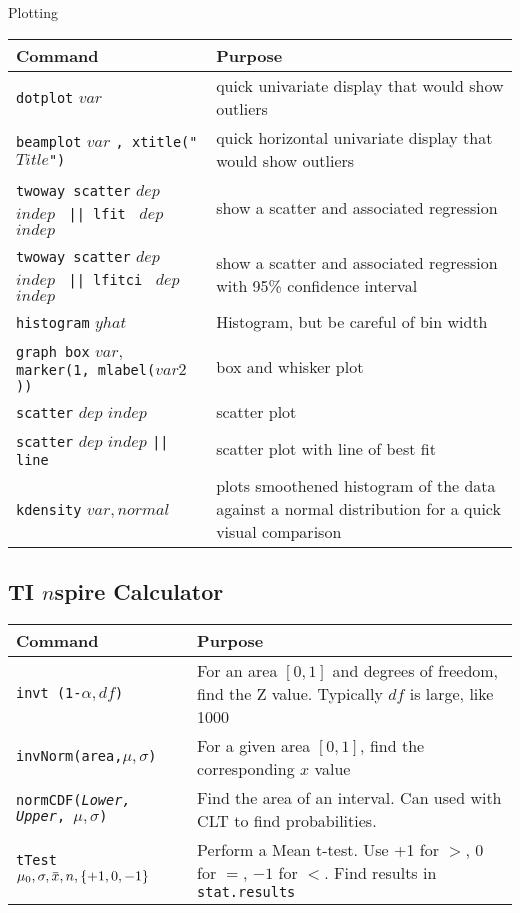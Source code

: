 \documentclass[11pt, oneside]{article}   	%
\newcommand{\overbar}[1]{\mkern 1.5mu\overline{\mkern-1.5mu#1\mkern-1.5mu}\mkern 1.5mu}
\begin{document}
\begin{center}
\large{Plotting}
\end{center}

\begin{tabular}{l p{ } }
Command & Purpose \\
\hline
\texttt{dotplot} $var$ & quick univariate display that would show outliers \\ 

\texttt{beamplot} $var$ \texttt{, xtitle("$Title$")} & quick horizontal univariate display that would show outliers \\ 


\texttt{twoway scatter} $dep$ $indep$ \texttt{  || lfit } $dep$ $indep$ & show a scatter and associated regression\\ 

\texttt{twoway scatter} $dep$ $indep$ \texttt{  || lfitci } $dep$ $indep$ & show a scatter and associated regression with 95\% confidence interval\\ 

\texttt{histogram} $yhat$ & Histogram, but be careful of bin width  \\

\texttt{graph box} $var,$ \texttt{ marker(1, mlabel($var2$)) } &  box and whisker plot\\

\texttt{scatter} $dep$ $indep$ & scatter plot \\

\texttt{scatter} $dep$ $indep$ \texttt{|| line } & scatter plot with line of best fit \\

\texttt{kdensity} $var, normal$ & plots smoothened histogram of the data against a normal distribution for a quick visual comparison \\

\end{tabular}




\break
\subsection{TI $n$spire Calculator}
\begin{tabular}{l p{ } }
Command & Purpose \\
\hline
\texttt{invt (1-$\alpha, df$)} & For an area $[0,1]$ and degrees of freedom, find the Z value. Typically $df$ is large, like 1000\\

\texttt{invNorm(area,$\mu, \sigma$)} & For a given area $[0,1]$, find the corresponding $x$ value \\

\texttt{normCDF(\textit{Lower, Upper}, $\mu, \sigma$)} & Find the area of an interval. Can used with CLT to find probabilities. \\

\texttt{tTest $\mu_0, \sigma, \overbar{x}, n, \{+1,0,-1\}$ } & Perform a Mean t-test. Use +1 for $>$, 0 for $=$, $-1$ for $<$. Find results in \texttt{stat.results} \\



\end{tabular}
\end{document}
